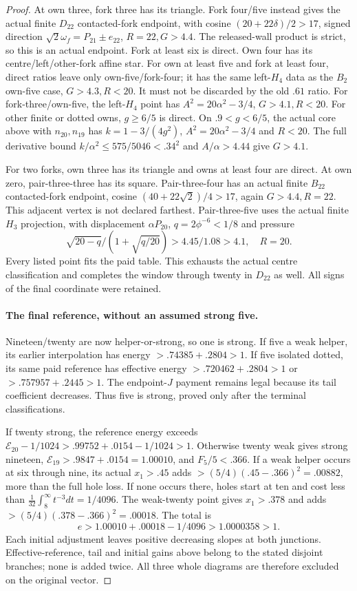 \documentclass[11pt]{article}
\theoremstyle{definition}
\theoremstyle{remark}
\begin{document}
\begin{proof}
At own three, fork three has its triangle. Fork four/five instead
gives the actual finite $D_{22}$ contacted-fork endpoint, with
cosine $(20+22\delta)/2>17$, signed direction
$\sqrt2\omega_f=P_{21}\mathbin\pm e_{22}$, $R=22,G>4.4$.
The released-wall product is strict, so this is an actual endpoint.
Fork at least six is direct. Own four has its centre/left/other-fork
affine star. For own at least five and fork at least four, direct
ratios leave only own-five/fork-four; it has the same left-$H_4$
data as the $B_2$ own-five case, $G>4.3,R<20$.
It must not be discarded by the old $.61$ ratio.
For fork-three/own-five, the left-$H_4$ point has
$A^2=20\alpha^2-3/4$, $G>4.1,R<20$.
For other finite or dotted owns, $g\ge6/5$ is direct. On
$.9<g<6/5$, the actual core above with $n_{20},n_{19}$ has
$k=1-3/(4g^2)$, $A^2=20\alpha^2-3/4$ and $R<20$.
The full derivative bound $k/\alpha^2\le575/5046<.34^2$
and $A/\alpha>4.44$ give $G>4.1$.

For two forks, own three has its triangle and owns at least four
are direct. At own zero, pair-three-three has its square.
Pair-three-four has an actual finite $B_{22}$ contacted-fork
endpoint, cosine $(40+22\sqrt2)/4>17$, again $G>4.4,R=22$.
This adjacent vertex is not declared farthest. Pair-three-five uses
the actual finite $H_3$ projection, with displacement $\alpha P_{20}$,
$q=2\phi^{-6}<1/8$ and pressure
\[
 \sqrt{20-q}/(1+\sqrt{q/20})>4.45/1.08>4.1,\quad R=20.
\]
Every listed point fits the paid table. This exhausts the actual
centre classification and completes the window through twenty in
$D_{22}$ as well. All signs of the final coordinate were retained.

\paragraph{The final reference, without an assumed strong five.}
Nineteen/twenty are now helper-or-strong, so one is strong.
If five a weak helper, its earlier interpolation has energy
$>.74385+.2804>1$. If five isolated dotted, its same paid
reference has effective energy $>.720462+.2804>1$ or
$>.757957+.2445>1$. The endpoint-$J$ payment remains legal
because its tail coefficient decreases. Thus five is strong,
proved only after the terminal classifications.

If twenty strong, the reference energy exceeds
$\mathcal E_{20}-1/1024>.99752+.0154-1/1024>1$.
Otherwise twenty weak gives strong nineteen,
$\mathcal E_{19}>.9847+.0154=1.00010$, and $F_5/5<.366$.
If a weak helper occurs at six through nine, its actual $x_1>.45$
adds $>(5/4)(.45-.366)^2=.00882$, more than the full hole loss.
If none occurs there, holes start at ten and cost less than
$\frac1{32}\int_8^\infty t^{-3}dt=1/4096$.
The weak-twenty point gives $x_1>.378$ and adds
$>(5/4)(.378-.366)^2=.00018$. The total is
\[
 e>1.00010+.00018-1/4096>1.0000358>1.
\]
Each initial adjustment leaves positive decreasing slopes at both
junctions. Effective-reference, tail and initial gains above belong
to the stated disjoint branches; none is added twice. All three
whole diagrams are therefore excluded on the original vector.
\end{proof}
\end{document}
